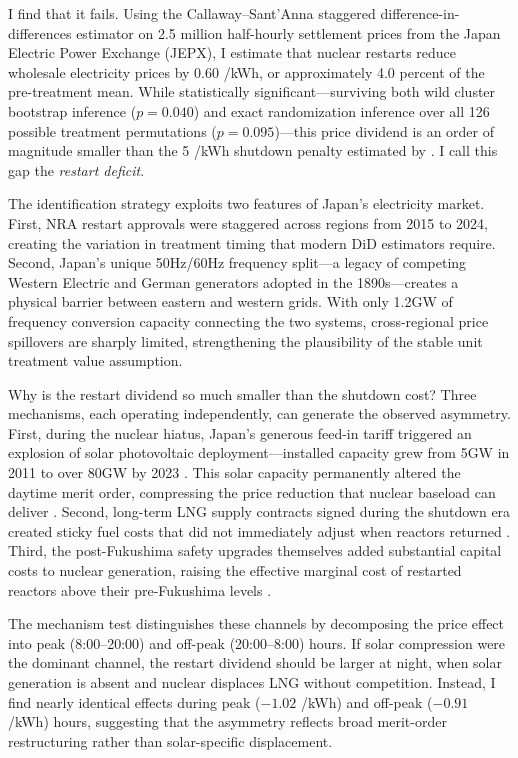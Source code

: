 \documentclass[12pt]{article}
\newcommand{\yen}{\textyen}
\begin{document}
I find that it fails. Using the Callaway--Sant'Anna staggered difference-in-differences estimator on 2.5 million half-hourly settlement prices from the Japan Electric Power Exchange (JEPX), I estimate that nuclear restarts reduce wholesale electricity prices by 0.60 \yen/kWh, or approximately 4.0 percent of the pre-treatment mean. While statistically significant---surviving both wild cluster bootstrap inference ($p=0.040$) and exact randomization inference over all 126 possible treatment permutations ($p=0.095$)---this price dividend is an order of magnitude smaller than the 5 \yen/kWh shutdown penalty estimated by \citet{Neidell2021}. I call this gap the \textit{restart deficit}.

The identification strategy exploits two features of Japan's electricity market. First, NRA restart approvals were staggered across regions from 2015 to 2024, creating the variation in treatment timing that modern DiD estimators require. Second, Japan's unique 50Hz/60Hz frequency split---a legacy of competing Western Electric and German generators adopted in the 1890s---creates a physical barrier between eastern and western grids. With only 1.2GW of frequency conversion capacity connecting the two systems, cross-regional price spillovers are sharply limited, strengthening the plausibility of the stable unit treatment value assumption.

Why is the restart dividend so much smaller than the shutdown cost? Three mechanisms, each operating independently, can generate the observed asymmetry. First, during the nuclear hiatus, Japan's generous feed-in tariff triggered an explosion of solar photovoltaic deployment---installed capacity grew from 5GW in 2011 to over 80GW by 2023 \citep{IEA2023}. This solar capacity permanently altered the daytime merit order, compressing the price reduction that nuclear baseload can deliver \citep{Fabra2021}. Second, long-term LNG supply contracts signed during the shutdown era created sticky fuel costs that did not immediately adjust when reactors returned \citep{Vivoda2019}. Third, the post-Fukushima safety upgrades themselves added substantial capital costs to nuclear generation, raising the effective marginal cost of restarted reactors above their pre-Fukushima levels \citep{Lipscy2013}.

The mechanism test distinguishes these channels by decomposing the price effect into peak (8:00--20:00) and off-peak (20:00--8:00) hours. If solar compression were the dominant channel, the restart dividend should be larger at night, when solar generation is absent and nuclear displaces LNG without competition. Instead, I find nearly identical effects during peak ($-1.02$ \yen/kWh) and off-peak ($-0.91$ \yen/kWh) hours, suggesting that the asymmetry reflects broad merit-order restructuring rather than solar-specific displacement.
\end{document}
